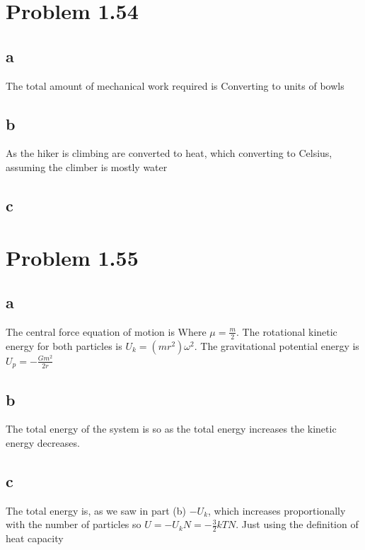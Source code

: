 \section*{Problem 1.54}
\subsection*{a}
The total amount of mechanical work required is
Converting to units of bowls

\subsection*{b}
As the hiker is climbing
are converted to heat, which converting to Celsius, assuming the climber is mostly water

\subsection*{c}

\section*{Problem 1.55}
\subsection*{a}
The central force equation of motion is
Where $\mu=\frac{m}{2}$. The rotational kinetic energy for both particles is $U_k=(mr^2)\omega^2$. The gravitational potential energy is $U_p=-\frac{Gm^2}{2r}$
\subsection*{b}
The total energy of the system is
so as the total energy increases the kinetic energy decreases.
\subsection*{c}
The total energy is, as we saw in part (b) $-U_k$, which increases proportionally with the number of particles so $U=-U_kN=-\frac{3}{2}kTN$. Just using the definition of heat capacity
